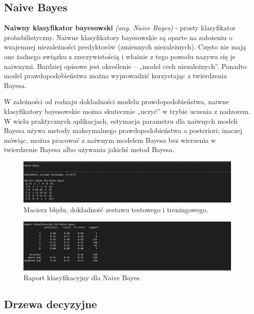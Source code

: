 \documentclass{article}
\begin{document}
\subsection{Naive Bayes}

\textbf{Naiwny klasyfikator bayesowski} \emph{(ang. Naive Bayes)} - prosty klasyfikator probabilistyczny. Naiwne klasyfikatory bayesowskie są oparte na założeniu o wzajemnej niezależności predyktorów (zmiennych niezależnych). Często nie mają one żadnego związku z rzeczywistością i właśnie z tego powodu nazywa się je naiwnymi. Bardziej opisowe jest określenie – „model cech niezależnych”. Ponadto model prawdopodobieństwa można wyprowadzić korzystając z twierdzenia Bayesa.

W zależności od rodzaju dokładności modelu prawdopodobieństwa, naiwne klasyfikatory bayesowskie można skutecznie „uczyć” w trybie uczenia z nadzorem. W wielu praktycznych aplikacjach, estymacja parametru dla naiwnych modeli Bayesa używa metody maksymalnego prawdopodobieństwa a posteriori; inaczej mówiąc, można pracować z naiwnym modelem Bayesa bez wierzenia w twierdzenie Bayesa albo używania jakichś metod Bayesa.
\newpage
\begin{figure}[!htb]
\centering
\includegraphics[width=\textwidth]{image/NV.png}
\caption{Macierz błędu, dokładność zestawu testowego i treningowego.}
\end{figure}

\begin{figure}[!htb]
\centering
\includegraphics[width=\textwidth]{image/raport_NV.png}
\caption{Raport klasyfikacyjny dla Naive Bayes.}
\end{figure}

\subsection{Drzewa decyzyjne}
\end{document}
